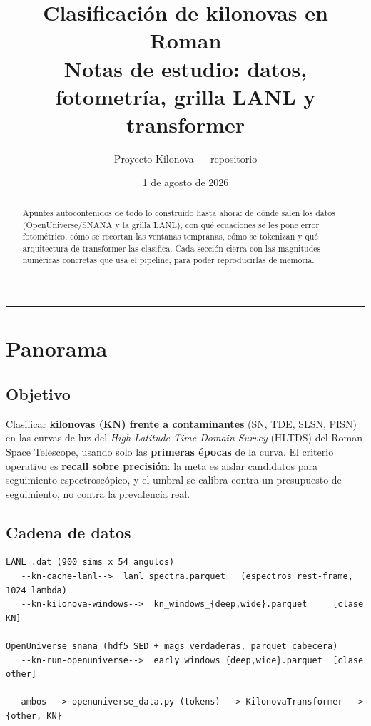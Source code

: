 \documentclass[11pt,a4paper]{article}
\title{\textbf{Clasificación de kilonovas en Roman}\\[2mm]
\large Notas de estudio: datos, fotometría, grilla LANL y transformer}
\author{Proyecto Kilonova --- repositorio \code{Kilonova}}
\date{1 de agosto de 2026}
\begin{document}
\maketitle

\begin{abstract}
\noindent Apuntes autocontenidos de todo lo construido hasta ahora: de dónde salen los datos
(OpenUniverse/SNANA y la grilla LANL), con qué ecuaciones se les pone error fotométrico, cómo se
recortan las ventanas tempranas, cómo se tokenizan y qué arquitectura de transformer las clasifica.
Cada sección cierra con las magnitudes numéricas concretas que usa el pipeline, para poder
reproducirlas de memoria.
\end{abstract}

\tableofcontents
\bigskip
\hrule

\section{Panorama}

\subsection{Objetivo}
Clasificar \textbf{kilonovas (KN) frente a contaminantes} (SN, TDE, SLSN, PISN) en las curvas de luz
del \emph{High Latitude Time Domain Survey} (HLTDS) del Roman Space Telescope, usando solo las
\textbf{primeras épocas} de la curva. El criterio operativo es \textbf{recall sobre precisión}: la
meta es aislar candidatos para seguimiento espectroscópico, y el umbral se calibra contra un
presupuesto de seguimiento, no contra la prevalencia real.

\subsection{Cadena de datos}
\begin{center}
\begin{minipage}{0.94\linewidth}
\small
\begin{verbatim}
LANL .dat (900 sims x 54 angulos)
   --kn-cache-lanl-->  lanl_spectra.parquet   (espectros rest-frame, 1024 lambda)
   --kn-kilonova-windows-->  kn_windows_{deep,wide}.parquet     [clase KN]

OpenUniverse snana (hdf5 SED + mags verdaderas, parquet cabecera)
   --kn-run-openuniverse-->  early_windows_{deep,wide}.parquet  [clase other]

   ambos --> openuniverse_data.py (tokens) --> KilonovaTransformer --> {other, KN}
\end{verbatim}
\end{minipage}
\end{center}
\end{document}

